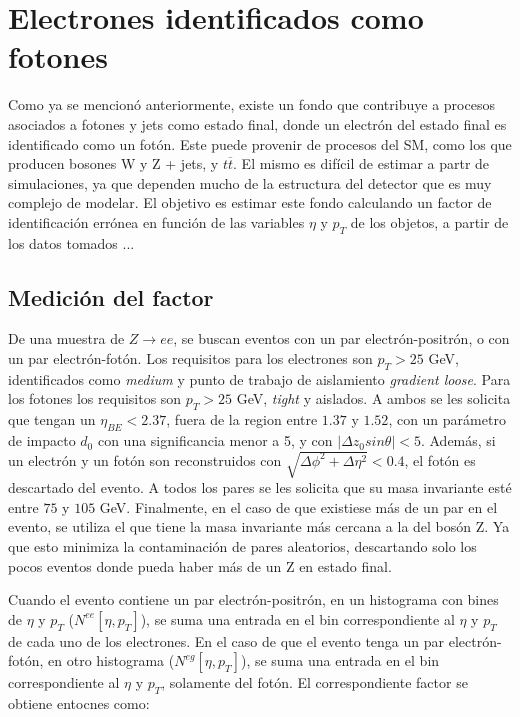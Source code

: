 \chapter{Electrones identificados como fotones}

Como ya se mencionó anteriormente, existe un fondo que contribuye a procesos asociados a fotones y jets como estado final, donde un electrón del estado final es identificado como un fotón. Este puede provenir de procesos del SM, como los que producen bosones W y Z + jets, y $t \overline{t}$. El mismo es difícil de estimar a partr de simulaciones, ya que dependen mucho de la estructura del detector que es muy complejo de modelar. El objetivo es estimar este fondo calculando un factor de identificación errónea en función de las variables $\eta$ y $p_{T}$ de los objetos, a partir de los datos tomados ...

\section{Medición del factor}

De una muestra de $Z\rightarrow ee$, se buscan eventos con un par electrón-positrón, o con un par electrón-fotón. Los requisitos para los electrones son $p_{T} > 25$ GeV, identificados como \textit{medium} y punto de trabajo de aislamiento \textit{gradient loose}. Para los fotones los requisitos son $p_{T} > 25$ GeV, \textit{tight} y aislados. A ambos se les solicita que tengan un $\eta_{BE}<2.37$, fuera de la region entre $1.37$ y $1.52$, con un parámetro de impacto $d_{0}$ con una significancia menor a 5, y con $|\Delta z_{0}sin\theta|<5$. Además, si un electrón y un fotón son reconstruidos con $\sqrt{\Delta\phi^{2}+\Delta\eta^{2}}<0.4$, el fotón es descartado del evento. A todos los pares se les solicita que su masa invariante esté entre $75$ y $105$ GeV. Finalmente, en el caso de que existiese más de un par en el evento, se utiliza el que tiene la masa invariante más cercana a la del bosón Z. Ya que esto minimiza la contaminación de pares aleatorios, descartando solo los pocos eventos donde pueda haber más de un Z en estado final.

Cuando el evento contiene un par electrón-positrón, en un histograma con bines de $\eta$ y $p_{T}$ ($N^{ee}[\eta , p_{T}]$), se suma una entrada en el bin correspondiente al $\eta$ y $p_{T}$ de cada uno de los electrones. En el caso de que el evento tenga un par electrón-fotón, en otro histograma ($N^{eg}[\eta , p_{T}]$), se suma una entrada en el bin correspondiente al $\eta$ y $p_{T}$, solamente del fotón. El correspondiente factor se obtiene entocnes como:


